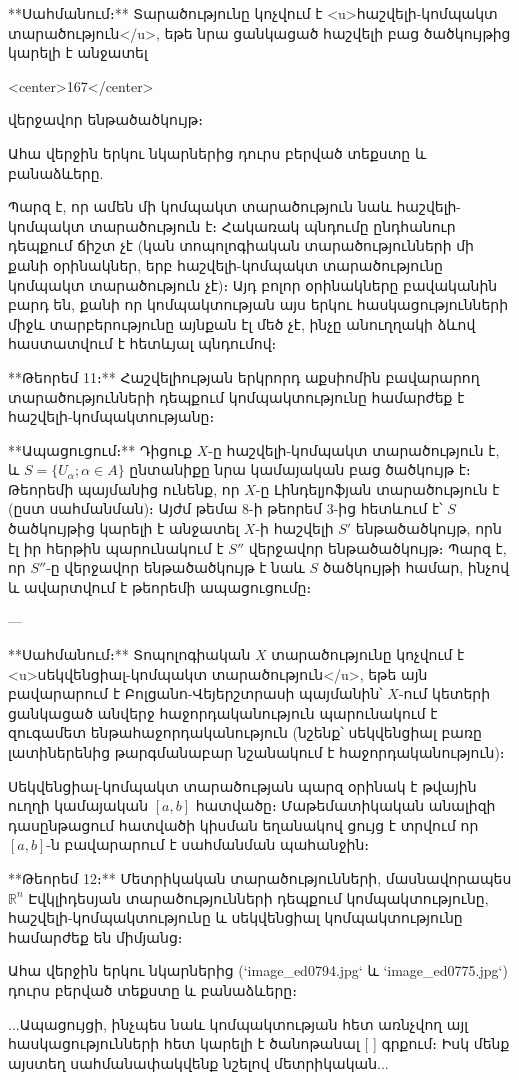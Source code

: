 **Սահմանում։** Տարածությունը կոչվում է <u>հաշվելի-կոմպակտ տարածություն</u>, եթե նրա ցանկացած հաշվելի բաց ծածկույթից կարելի է անջատել

<center>167</center>

վերջավոր ենթածածկույթ։


Ահա վերջին երկու նկարներից դուրս բերված տեքստը և բանաձևերը.

Պարզ է, որ ամեն մի կոմպակտ տարածություն նաև հաշվելի-կոմպակտ տարածություն է։ Հակառակ պնդումը ընդհանուր դեպքում ճիշտ չէ (կան տոպոլոգիական տարածությունների մի քանի օրինակներ, երբ հաշվելի-կոմպակտ տարածությունը կոմպակտ տարածություն չէ)։ Այդ բոլոր օրինակները բավականին բարդ են, քանի որ կոմպակտության այս երկու հասկացությունների միջև տարբերությունը այնքան էլ մեծ չէ, ինչը անուղղակի ձևով հաստատվում է հետևյալ պնդումով։

**Թեորեմ 11։** Հաշվելիության երկրորդ աքսիոմին բավարարող տարածությունների դեպքում կոմպակտությունը համարժեք է հաշվելի-կոմպակտությանը։

**Ապացուցում։** Դիցուք $X$-ը հաշվելի-կոմպակտ տարածություն է, և $S = \{U_\alpha; \alpha \in A\}$ ընտանիքը նրա կամայական բաց ծածկույթ է։ Թեորեմի պայմանից ունենք, որ $X$-ը Լինդելյոֆյան տարածություն է (ըստ սահմանման)։ Այժմ թեմա 8-ի թեորեմ 3-ից հետևում է՝ $S$ ծածկույթից կարելի է անջատել $X$-ի հաշվելի $S'$ ենթածածկույթ, որն էլ իր հերթին պարունակում է $S''$ վերջավոր ենթածածկույթ։ Պարզ է, որ $S''$-ը վերջավոր ենթածածկույթ է նաև $S$ ծածկույթի համար, ինչով և ավարտվում է թեորեմի ապացուցումը։

---

**Սահմանում։** Տոպոլոգիական $X$ տարածությունը կոչվում է <u>սեկվենցիալ-կոմպակտ տարածություն</u>, եթե այն բավարարում է Բոլցանո-Վեյերշտրասի պայմանին՝ $X$-ում կետերի ցանկացած անվերջ հաջորդականություն պարունակում է զուգամետ ենթահաջորդականություն (նշենք՝ սեկվենցիալ բառը լատիներենից թարգմանաբար նշանակում է հաջորդականություն)։

Սեկվենցիալ-կոմպակտ տարածության պարզ օրինակ է թվային ուղղի կամայական $[a, b]$ հատվածը։ Մաթեմատիկական անալիզի դասընթացում հատվածի կիսման եղանակով ցույց է տրվում որ $[a, b]$-ն բավարարում է սահմանման պահանջին։

**Թեորեմ 12։** Մետրիկական տարածությունների, մասնավորապես $\mathbb{R}^n$ Էվկլիդեսյան տարածությունների դեպքում կոմպակտությունը, հաշվելի-կոմպակտությունը և սեկվենցիալ կոմպակտությունը համարժեք են միմյանց։


Ահա վերջին երկու նկարներից (`image_ed0794.jpg` և `image_ed0775.jpg`) դուրս բերված տեքստը և բանաձևերը։

...Ապացույցի, ինչպես նաև կոմպակտության հետ առնչվող այլ հասկացությունների հետ կարելի է ծանոթանալ [ ] գրքում։ Իսկ մենք այստեղ սահմանափակվենք նշելով մետրիկական...

